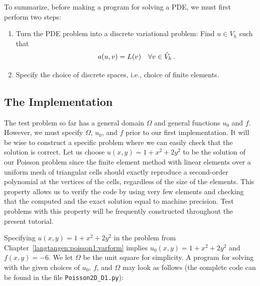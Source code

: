 To summarize, before making a \fenics{} program for solving a PDE,
we must first perform two steps:
\begin{enumerate}
\item Turn the PDE problem into a discrete
variational problem: Find $u\in V_h$
such that
\[ a(u,v) = L(v)\quad\forall v\in \hat{V}_h\thinspace . \]
\item Specify the choice of discrete spaces, i.e., choice of finite elements.
\end{enumerate}

\subsection{The Implementation}
\label{langtangen:poisson1:impl}

The test problem so far has a general domain $\Omega$ and general functions
$u_0$ and $f$. However,
we must specify $\Omega$, $u_0$, and $f$ prior to our first implementation.
It will be wise to construct a specific problem where we can easily check
that the solution is correct.
Let us choose $u(x,y)=1 + x^2 + 2y^2$ to be the solution of our
Poisson problem since the finite element method with linear elements
over a uniform mesh of triangular cells
should exactly reproduce a second-order polynomial
at the vertices of the cells, regardless of the size
of the elements. This property allows us to verify the code by
using very few elements and
checking that the computed and the exact solution equal to machine precision.
Test problems with this property will be frequently constructed throughout
the present
tutorial.

Specifying $u(x,y)=1 + x^2 + 2y^2$ in the
problem from Chapter~\ref{langtangen:poisson1:varform} implies
$u_0(x,y)= 1 + x^2 + 2y^2$
and $f(x,y)=-6$.
We let $\Omega$ be the unit square for simplicity.
A \fenics{} program for solving  with the given choices
of $u_0$, $f$, and $\Omega$ may look as follows (the complete code can be
found in the file {\fontsize{12pt}{12pt}\verb!Poisson2D_D1.py!}):

